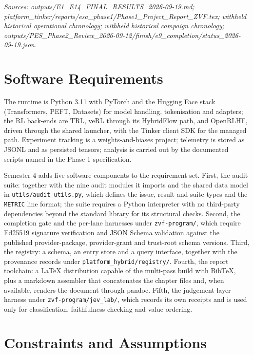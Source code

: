 \documentclass[12pt,a4paper]{report}
\DeclareRobustCommand{\longtok}[1]{\texttt{\seqsplit{#1}}}
\begin{document}
\emph{Sources: outputs/E1\_\allowbreak{}E14\_\allowbreak{}FINAL\_\allowbreak{}RESULTS\_\allowbreak{}2026-09-19.md;
platform\_tinker/reports/esa\_phase1/Phase1\_\allowbreak{}Project\_\allowbreak{}Report\_\allowbreak{}ZVF.tex;
withheld historical operational chronology; withheld historical campaign
chronology;
outputs/PES\_\allowbreak{}Phase2\_\allowbreak{}Review\_\allowbreak{}2026-09-12/finish/e9\_completion/status\_2026-09-19.json.}

\section{Software Requirements}\label{software-requirements}

The runtime is Python 3.11 with PyTorch and the Hugging Face stack
(Transformers, PEFT, Datasets) for model handling, tokenisation and
adapters; the RL back-ends are TRL, veRL through its HybridFlow path,
and OpenRLHF, driven through the shared launcher, with the Tinker client
SDK for the managed path. Experiment tracking is a weights-and-biases
project; telemetry is stored as JSONL and as persisted tensors; analysis
is carried out by the documented scripts named in the Phase-1
specification.

Semester 4 adds five software components to the requirement set. First,
the audit suite: \longtok{platform\_local/run\_\allowbreak{}all\_\allowbreak{}audits.py} together
with the nine audit modules it imports and the shared data model in
\texttt{utils/audit\_utils.py}, which defines the issue, result and
suite types and the \texttt{METRIC} line format; the suite requires a
Python interpreter with no third-party dependencies beyond the standard
library for its structural checks. Second, the completion gate and the
per-lane harnesses under \texttt{zvf-program/}, which require Ed25519
signature verification and JSON Schema validation against the published
provider-package, provider-grant and trust-root schema versions. Third,
the registry: a schema, an entry store and a query interface, together
with the provenance records under \texttt{platform\_hybrid/registry/}.
Fourth, the report toolchain: a LaTeX distribution capable of the
multi-pass build with BibTeX, plus a markdown assembler that
concatenates the chapter files and, when available, renders the document
through pandoc. Fifth, the judgement-layer harness under
\texttt{zvf-program/jev\_lab/}, which records its own receipts and is
used only for classification, faithfulness checking and value ordering.

\section{Constraints and Assumptions}\label{constraints-and-assumptions}
\end{document}
